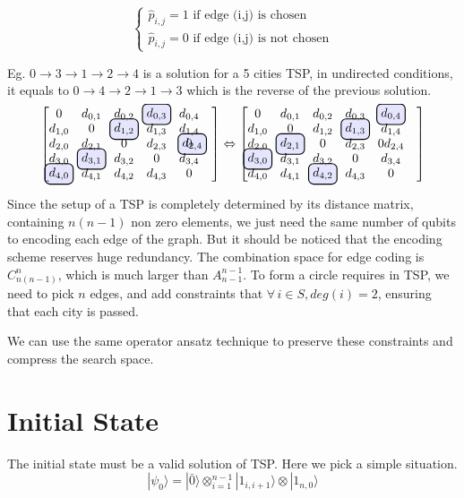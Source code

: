 \documentclass[%
aps, %
prl, %
preprint, %
12pt, %
amsfonts, %
amssymb, %
amsmath, %
notitlepage, %
raggedbottom, %
]{revtex4-1}
\newcommand{\bra}[1]{|#1\rangle}
\newcommand\hlight[1]{\tikz[overlay, remember picture,baseline=-\the\dimexpr\fontdimen22\textfont2\relax]\node[rectangle,fill=blue!50,rounded corners,fill opacity = 0.2,draw,thick,text opacity =1] {$#1$};}
\begin{document}
$$
\begin{cases}
    \hat p_{i,j}=1 \text{ if edge (i,j) is chosen} \\
    \hat p_{i,j}=0 \text{ if edge (i,j) is not chosen}
\end{cases} 
$$

Eg.
$0\rightarrow3\rightarrow1\rightarrow2\rightarrow4$ is a solution for a 5 cities TSP,
in undirected conditions, it equals to 
$0\rightarrow4\rightarrow2\rightarrow1\rightarrow3$ which is the reverse of the previous solution.
$$
\begin{bmatrix}
    0&d_{0,1}&d_{0,2}&\hlight{d_{0,3}}&d_{0,4}&\\
    d_{1,0}&0&\hlight{d_{1,2}}&d_{1,3}&d_{1,4}&\\
    d_{2,0}&d_{2,1}&0&d_{2,3}&0\hlight{d_{2,4}}&\\
    d_{3,0}&\hlight{d_{3,1}}&d_{3,2}&0&d_{3,4}&\\
    \hlight{d_{4,0}}&d_{4,1}&d_{4,2}&d_{4,3}&0&\\
\end{bmatrix}
\Leftrightarrow
\begin{bmatrix}
    0&d_{0,1}&d_{0,2}&d_{0,3}&\hlight{d_{0,4}}&\\
    d_{1,0}&0&d_{1,2}&\hlight{d_{1,3}}&d_{1,4}&\\
    d_{2,0}&\hlight{d_{2,1}}&0&d_{2,3}&0d_{2,4}&\\
    \hlight{d_{3,0}}&d_{3,1}&d_{3,2}&0&d_{3,4}&\\
    d_{4,0}&d_{4,1}&\hlight{d_{4,2}}&d_{4,3}&0&\\
\end{bmatrix}
$$

Since the setup of a TSP is completely determined by its distance matrix, containing $n(n-1)$ non zero elements, we just need the same number of qubits to encoding each edge of the graph. But it should be noticed that the encoding scheme reserves huge redundancy. The combination space for edge coding is $C_{n(n-1)}^n$, which is much larger than $A_{n-1}^{n-1}$. To form a circle requires in TSP, we need to pick $n$ edges, and add constraints that $\forall\, i\in S, deg(i)=2$, ensuring that each city is passed. 

We can use the same operator ansatz technique to preserve these constraints and compress the search space.

\section{Initial State}
The initial state must be a valid solution of TSP. Here we pick a simple situation. 
$$
|\psi_0\rangle=|\bar 0\rangle \otimes_{i=1}^{n-1} |1_{i,i+1}\rangle\otimes\bra{1_{n,0}}
$$
\end{document}
